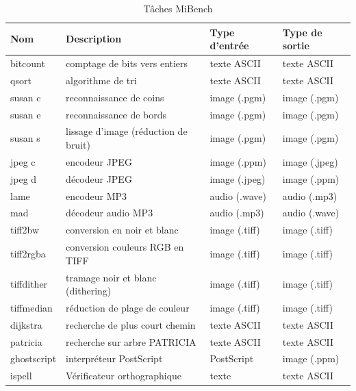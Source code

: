 \documentclass[french, a4paper, 11pt, twoside, pdftex]{StyleThese}
\begin{document}
\begin{table}[ht!]
	\centering
	\caption{Tâches MiBench}
	\label{tab:mibench_tasks}
	\begin{tabular}{@{}llll@{}}
		\toprule
		Nom          & Description                                  & Type d'entrée      & Type de sortie         \\ \midrule
		bitcount     & comptage de bits	vers entiers        & texte ASCII        & texte ASCII         \\
		qsort        & algorithme de tri                    & texte ASCII        & texte ASCII         \\
		susan c      & reconnaissance de coins              & image (.pgm)       & image (.pgm)        \\
		susan e      & reconnaissance de bords              & image (.pgm)       & image (.pgm)        \\
		susan s      & lissage d'image (réduction de bruit) & image (.pgm)       & image (.pgm)        \\
		jpeg c       & encodeur JPEG                        & image (.ppm)       & image (.jpeg)       \\
		jpeg d       & décodeur JPEG                        & image (.jpeg)      & image (.ppm)        \\
		lame         & encodeur MP3                         & audio (.wave)      & audio (.mp3)        \\
		mad          & décodeur audio MP3                   & audio (.mp3)       & audio (.wave)       \\
		tiff2bw      & conversion en noir et blanc          & image (.tiff)      & image (.tiff)       \\
		tiff2rgba    & conversion couleurs RGB en TIFF		& image (.tiff)      & image (.tiff)       \\
		tiffdither   & tramage noir et blanc (dithering)    & image (.tiff)      & image (.tiff)       \\
		tiffmedian   & réduction de plage de couleur      	& image (.tiff)      & image (.tiff)       \\
		dijkstra     & recherche de plus court chemin		& texte ASCII        & texte ASCII         \\
		patricia     & recherche sur arbre PATRICIA			& texte ASCII        & texte ASCII         \\
		ghostscript  & interpréteur PostScript              & PostScript		 & image (.ppm)        \\
		ispell       & Vérificateur orthographique          & texte              & texte ASCII		   \\

\end{tabular}
\end{table}
\end{document}
